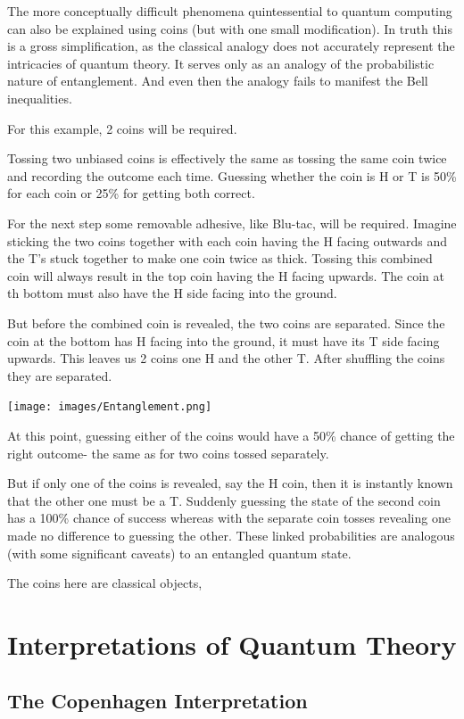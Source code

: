 \documentclass{book}
\begin{document}
The more conceptually difficult phenomena quintessential to quantum computing can also be explained using coins (but with one small modification). In truth this is a gross simplification, as the classical analogy does not accurately represent the intricacies of quantum theory. It serves only as an analogy of the probabilistic nature of entanglement. And even then the analogy fails to manifest the Bell inequalities. 

For this example, 2 coins will be required. 

Tossing two unbiased coins is effectively the same as tossing the same coin twice and recording the outcome each time. Guessing whether the coin is H or T is 50\% for each coin or 25\% for getting both correct. 

For the next step some removable adhesive, like Blu-tac, will be required. Imagine sticking the two coins together with each coin having the H facing outwards and the T's stuck together to make one coin twice as thick. Tossing this combined coin will always result in the top coin having the H facing upwards. The coin at th bottom must also have the H side facing into the ground. 

But before the combined coin is revealed, the two coins are separated. Since the coin at the bottom has H facing into the ground, it must have its T side facing upwards. This leaves us 2 coins one H and the other T. After shuffling the coins they are separated. 

\texttt{[image: images/Entanglement.png]}

At this point, guessing either of the coins would have a 50\% chance of getting the right outcome- the same as for two coins tossed separately. 

But if only one of the coins is revealed, say the H coin, then it is instantly known that the other one must be a T. Suddenly guessing the state of the second coin has a 100\% chance of success whereas with the separate coin tosses revealing one made no difference to guessing the other. These linked probabilities are analogous (with some significant caveats) to an entangled quantum state.

The coins here are classical objects, 

\section{Interpretations of Quantum Theory}

\subsection{The Copenhagen Interpretation}
\end{document}
